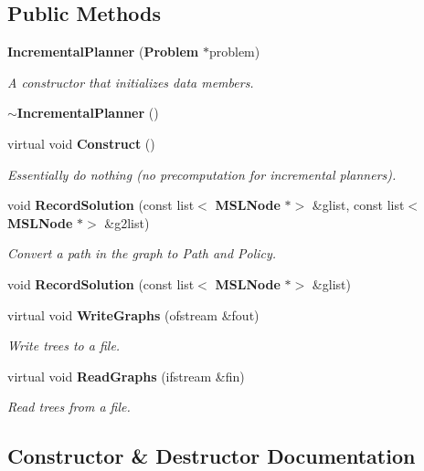 \subsection*{Public Methods}
\begin{CompactItemize}
\item 
{\bf Incremental\-Planner} ({\bf Problem} $\ast$problem)
\begin{CompactList}\small\item\em A constructor that initializes data members.\item\end{CompactList}\item 
{\bf $\sim$Incremental\-Planner} ()
\item 
virtual void {\bf Construct} ()
\begin{CompactList}\small\item\em Essentially do nothing (no precomputation for incremental planners).\item\end{CompactList}\item 
void {\bf Record\-Solution} (const list$<$ {\bf MSLNode} $\ast$$>$ \&glist, const list$<$ {\bf MSLNode} $\ast$$>$ \&g2list)
\begin{CompactList}\small\item\em Convert a path in the graph to Path and Policy.\item\end{CompactList}\item 
void {\bf Record\-Solution} (const list$<$ {\bf MSLNode} $\ast$$>$ \&glist)
\item 
virtual void {\bf Write\-Graphs} (ofstream \&fout)
\begin{CompactList}\small\item\em Write trees to a file.\item\end{CompactList}\item 
virtual void {\bf Read\-Graphs} (ifstream \&fin)
\begin{CompactList}\small\item\em Read trees from a file.\item\end{CompactList}\end{CompactItemize}


\subsection{Constructor \& Destructor Documentation}
